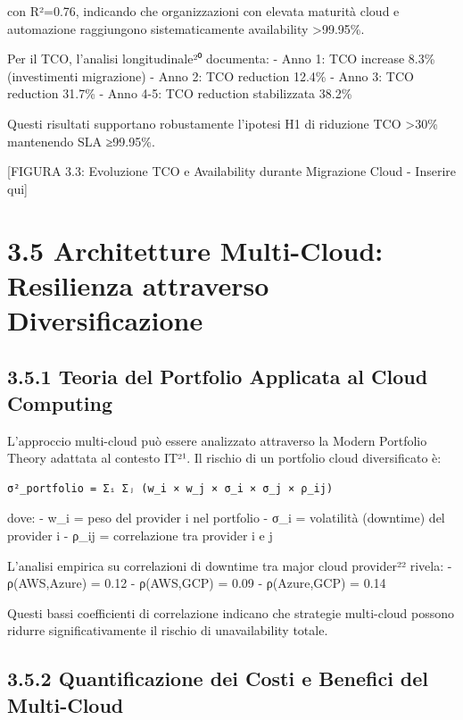 \documentclass[12pt,a4paper,oneside]{book}
\numberwithin{figure}{chapter} %
\numberwithin{table}{chapter}  %
\begin{document}
con R²=0.76, indicando che organizzazioni con elevata maturità cloud e
automazione raggiungono sistematicamente availability
\textgreater99.95\%.

Per il TCO, l'analisi longitudinale²⁰ documenta: - Anno 1: TCO increase
8.3\% (investimenti migrazione) - Anno 2: TCO reduction 12.4\% - Anno 3:
TCO reduction 31.7\% - Anno 4-5: TCO reduction stabilizzata 38.2\%

Questi risultati supportano robustamente l'ipotesi H1 di riduzione TCO
\textgreater30\% mantenendo SLA ≥99.95\%.

{[}FIGURA 3.3: Evoluzione TCO e Availability durante Migrazione Cloud -
Inserire qui{]}

\section{3.5 Architetture Multi-Cloud: Resilienza attraverso
Diversificazione}\label{architetture-multi-cloud-resilienza-attraverso-diversificazione}

\subsection{3.5.1 Teoria del Portfolio Applicata al Cloud
Computing}\label{teoria-del-portfolio-applicata-al-cloud-computing}

L'approccio multi-cloud può essere analizzato attraverso la Modern
Portfolio Theory adattata al contesto IT²¹. Il rischio di un portfolio
cloud diversificato è:

\begin{verbatim}
σ²_portfolio = Σᵢ Σⱼ (w_i × w_j × σ_i × σ_j × ρ_ij)
\end{verbatim}

dove: - w\_i = peso del provider i nel portfolio - σ\_i = volatilità
(downtime) del provider i - ρ\_ij = correlazione tra provider i e j

L'analisi empirica su correlazioni di downtime tra major cloud
provider²² rivela: - ρ(AWS,Azure) = 0.12 - ρ(AWS,GCP) = 0.09 -
ρ(Azure,GCP) = 0.14

Questi bassi coefficienti di correlazione indicano che strategie
multi-cloud possono ridurre significativamente il rischio di
unavailability totale.

\subsection{3.5.2 Quantificazione dei Costi e Benefici del
Multi-Cloud}\label{quantificazione-dei-costi-e-benefici-del-multi-cloud}
\end{document}
